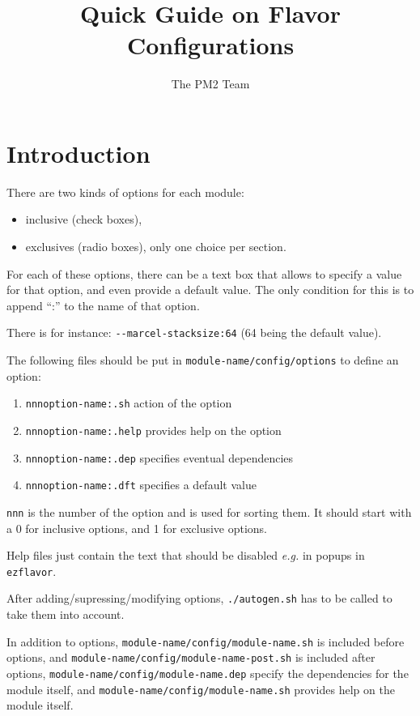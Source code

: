 \documentclass[11pt, a4paper ,twoside]{article}
\begin{document}
\title{Quick Guide on Flavor Configurations}
\author{The PM2 Team}
\date{}
\maketitle

\section{Introduction}

There are two kinds of options for each module:
\begin{itemize}
\item inclusive (check boxes),
\item exclusives (radio boxes), only one choice per section.
\end{itemize}

For each of these options, there can be a text box that allows to
specify a value for that option, and even provide a default value.
The only condition for this is to append ``:'' to the name of that
option.

There is for instance: \verb|--marcel-stacksize:64| (64 being the
default value).

The following files should be put in \verb|module-name/config/options| to
define an option:
\begin{enumerate}
\item \verb|nnnoption-name:.sh| action of the option
\item \verb|nnnoption-name:.help| provides help on the option
\item \verb|nnnoption-name:.dep| specifies eventual dependencies
\item \verb|nnnoption-name:.dft| specifies a default value
\end{enumerate}

\verb+nnn+ is the number of the option and is used for sorting them. It
should start with a 0 for inclusive options, and 1 for exclusive
options.

Help files just contain the text that should be disabled \emph{e.g.} in
popups in \verb+ezflavor+.

After adding/supressing/modifying options, \verb+./autogen.sh+ has
to be called to take them into account.

In addition to options, \verb+module-name/config/module-name.sh+
is included before options, and
\verb+module-name/config/module-name-post.sh+ is included after options,
\verb+module-name/config/module-name.dep+ specify the dependencies for
the module itself, and \verb+module-name/config/module-name.sh+ provides
help on the module itself.
\end{document}
